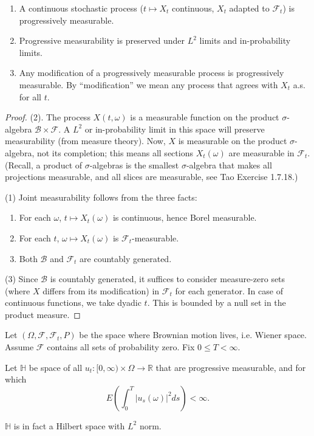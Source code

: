 \begin{proposition}
	\begin{enumerate}
		\item A continuous stochastic process ($t \mapsto X_t$ continuous, $X_t$ adapted to $\mathcal{F}_t$) is progressively measurable.
		\item Progressive measurability is preserved under $L^2$ limits and in-probability limits. 
		\item Any modification of a progressively measurable process is progressively measurable. By ``modification'' we mean any process that agrees with $X_t$ a.s. for all $t$.
	\end{enumerate}
\end{proposition}
\begin{proof}
	(2). The process $X(t, \omega)$ is a measurable function on the product $\sigma$-algebra $\mathcal{B} \times \mathcal{F}$. A $L^2$ or in-probability limit in this space will preserve measurability (from measure theory). Now, $X$ is measurable on the product $\sigma$-algebra, not its completion; this means all sections $X_t(\omega)$ are measurable in $\mathcal{F}_t$. (Recall, a product of $\sigma$-algebras is the smallest $\sigma$-algebra that makes all projections measurable, and all slices are measurable, see Tao Exercise 1.7.18.)

	(1) Joint measurability follows from the three facts:
	\begin{enumerate}
		\item For each $\omega$, $t \mapsto X_t(\omega)$ is continuous, hence Borel measurable.
		\item For each $t$, $\omega \mapsto X_t(\omega)$ is $\mathcal{F}_t$-measurable.
		\item Both $\mathcal{B}$ and $\mathcal{F}_t$ are countably generated.
	\end{enumerate}


	(3) Since $\mathcal{B}$ is countably generated, it suffices to consider measure-zero sets (where $X$ differs from its modification) in $\mathcal{F}_t$ for each generator. In case of continuous functions, we take dyadic $t$. This is bounded by a null set in the product measure.
\end{proof}

\begin{definition}
	Let $(\Omega, \mathcal{F}, \mathcal{F}_t, P)$ be the space where Brownian motion lives, i.e. Wiener space. Assume $\mathcal{F}$ contains all sets of probability zero. Fix $0 \le  T < \infty $. 

	Let $\mathbb{H}$ be space of all $u_t : [0,\infty ) \times \Omega \to  \mathbb{R}$ that are progressive measurable, and for which
	\[
		E \left( \int _0^T |u_s(\omega)|^2 ds  \right) < \infty 
	.\] 
\end{definition}
$\mathbb{H}$ is in fact a Hilbert space with $L^2$ norm.

